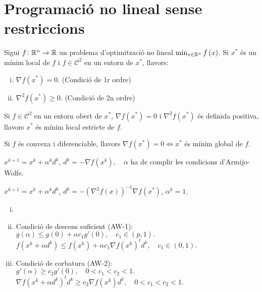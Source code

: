 \section{Programaci\'o no lineal sense restriccions}

\begin{teo*}
    Sigui $f \colon \mathbb{R}^n \to \mathbb{R}$ un problema d'optimitzaci\'o no lineal $\min_{x\in\mathbb{R}^n} f\left( x \right)$. Si $x^*$ \'es un m\'inim local de $f$ i $f \in \mathcal{C}^2$ en un entorn de $x^*$, llavors:
    \begin{enumerate}[i)]
        \item $\nabla f\left( x^* \right) = 0$. (Condici\'o de 1r ordre)
        \item $\nabla^2 f\left( x^* \right) \geq 0$. (Condici\'o de 2n ordre)
    \end{enumerate}
\end{teo*}
\begin{teo*}
    Si $f \in \mathcal{C}^2$ en un entorn obert de $x^*$, $\nabla f\left( x^* \right) = 0$ i $\nabla^2 f\left( x^* \right)$ \'es definida positiva, llavors $x^*$ \'es m\'inim local estricte de $f$.
\end{teo*}
\begin{teo*}
    Si $f$ \'es convexa i diferenciable, llavors $\nabla f\left( x^* \right) = 0 \iff x^*$ \'es m\'inim global de $f$.
\end{teo*}
\begin{met}
    $x^{k+1} = x^k + \alpha^kd^k$, \quad $d^k = -\nabla f\left( x^k \right), \quad \alpha$ ha de complir les condicions d'Armijo-Wolfe.
\end{met}
\begin{met}[de Newton]
    $x^{k+1} = x^k + \alpha^kd^k$, \quad $d^k = -\left( \nabla^2 f\left( x \right) \right)^{-1} \nabla f\left( x^* \right)$, \quad$\alpha^k = 1$.
\end{met}
\begin{prop}
    \begin{enumerate}[i)]
        \item[]
        \item Condici\'o de descens suficient (AW-1): \\
            \indent $g\left( \alpha \right) \leq g\left( 0 \right) + \alpha c_1g'\left( 0 \right), \quad c_1 \in (p,1).$ \\
            \indent $f\left( x^k + \alpha d^k \right) \leq f\left( x^k \right) + \alpha c_1 \nabla f\left( x^k \right)^t d^k, \quad c_1 \in (0,1).$
        \item Condici\'o de corbatura (AW-2): \\
            \indent $g'\left( \alpha \right) \geq c_2 g'\left( 0 \right), \quad 0 < c_1 < c_2 < 1.$ \\
        \indent $\nabla f\left( x^k + \alpha d^k \right)^td^k \geq c_2 \nabla f\left( x^k \right)d^k, \quad 0 < c_1 < c_2 < 1$.
    \end{enumerate}
\end{prop}

